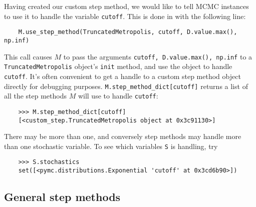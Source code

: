 \medskip
Having created our custom step method, we would like to tell MCMC instances to use it to handle the variable \texttt{cutoff}. This is done in  with the following line:
\begin{verbatim}
	M.use_step_method(TruncatedMetropolis, cutoff, D.value.max(), np.inf)
\end{verbatim}
This call causes $M$ to pass the arguments \texttt{cutoff, D.value.max(), np.inf} to a \texttt{TruncatedMetropolis} object's \texttt{init} method, and use the object to handle \texttt{cutoff}. It's often convenient to get a handle to a custom step method object directly for debugging purposes. \texttt{M.step_method_dict[cutoff]} returns a list of all the step methods $M$ will use to handle \texttt{cutoff}:
\begin{verbatim}
	>>> M.step_method_dict[cutoff]
	[<custom_step.TruncatedMetropolis object at 0x3c91130>]
\end{verbatim}
There may be more than one, and conversely step methods may handle more than one stochastic variable. To see which variables \texttt{S} is handling, try
\begin{verbatim}
	>>> S.stochastics
	set([<pymc.distributions.Exponential 'cutoff' at 0x3cd6b90>])
\end{verbatim}

\hypertarget{user-gen}{}
\subsection*{General step methods} \label{user-gen}

